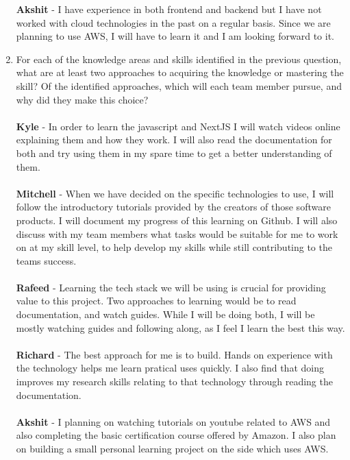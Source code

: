 \documentclass[12pt]{article}
\begin{document}
\begin{enumerate}
    \textbf{Akshit} - I have experience in both frontend and backend
    but I have not worked
    with cloud technologies in the past on a regular basis. Since we
    are planning to use AWS,
    I will have to learn it and I am looking forward to it. \\
  \item For each of the knowledge areas and skills identified in the previous
    question, what are at least two approaches to acquiring the knowledge or
    mastering the skill?  Of the identified approaches, which will each team
    member pursue, and why did they make this choice? \\
    \\
    \textbf{Kyle} - In order to learn the javascript and NextJS I
    will watch videos online explaining them and how they work. I
    will also read the documentation for both and try using them in
    my spare time to get a better understanding of them.\\
    \\
    \textbf{Mitchell} - When we have decided on the specific
    technologies to use, I will follow the introductory tutorials
    provided by the creators of those software products. I will
    document my progress of this learning on Github. I will also
    discuss with my team members what tasks would be suitable for me
    to work on at my skill level, to help develop my skills while
    still contributing to the teams success. \\
    \\
    \textbf{Rafeed} - Learning the tech stack we will be using is
    crucial for providing value to this project. Two approaches to
    learning would be to read documentation, and watch guides. While
    I will be doing both, I will be mostly watching guides and
    following along, as I feel I learn the best this way. \\
    \\
    \textbf{Richard} - The best approach for me is to build. Hands on experience
    with the technology helps me learn pratical uses quickly. I also find that
    doing improves my research skills relating to that technology
    through reading
    the documentation.\\
    \\
    \textbf{Akshit} - I planning on watching tutorials on youtube related to AWS
    and also completing the basic certification course offered by
    Amazon. I also plan on building a
    small personal learning project on the side which uses AWS.\\
\end{enumerate}

\newpage



\nocite{*}
\end{document}

